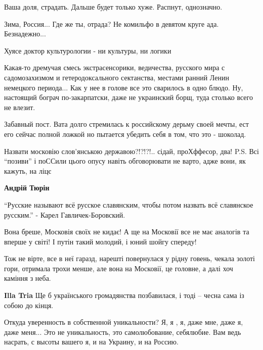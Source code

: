 \begin{itemize}
Ваша доля, страдать. Дальше будет только хуже. Распнут, однозначно.

Зима, Россия... Где же ты, отрада? Не комильфо в девятом круге ада. Безнадежно...

Хуясе доктор культурологии - ни культуры, ни логики


Какая-то дремучая смесь экстрасенсорики, ведичества, русского мира с
садомозахизмом и гетеродоксального сектанства, местами ранний Ленин немецкого
периода... Как у нее в голове все это сварилось в одно блюдо. Ну, настоящий
бограч по-закарпатски, даже не украинский борщ, туда столько всего не влезит.



Забавный пост. Вата долго стремилась к российскому дерьму своей мечты, ест его
сейчас полной ложкой но пытается убедить себя в том, что это - шоколад.


Назвати московію слов'янською державою?!?!?!.. сідай, проХффесор, два!
P.S. Всі \enquote{позиви} і поССили цього опусу навіть обговорювати не варто,
адже вони, як кажуть, на ліцє

\begin{itemize} %
\textbf{Андрій Тюрін} 

\enquote{Русские называют всё русское славянским, чтобы потом назвать всё славянское
русским.} - Карел Гавличек-Боровский.
\end{itemize} %


Вона бреше, Московія своїх не кидає! А ще на Московії все не має аналогів та
вперше у світі! І путін такий молодий, і юний шойгу спереду!

Тож не вірте, все в неї гаразд, нарешті повернулася у рідну говень, чекала
золоті гори, отримала трохи менше, але вона на Московії, це головне, а далі хоч
каміння з неба.

\textbf{Illa Tria} Ще б українського громадянства позбавилася, і тоді – чесна сама із собою до кінця.


Откуда уверенность в собственной уникальности? Я, я , я, даже мне, даже я, даже
меня... Это не уникальность, это самолюбование, себялюбие. Вам ведь насрать, с
высоты вашего я, и на Украину, и на Россию.



\end{itemize}
